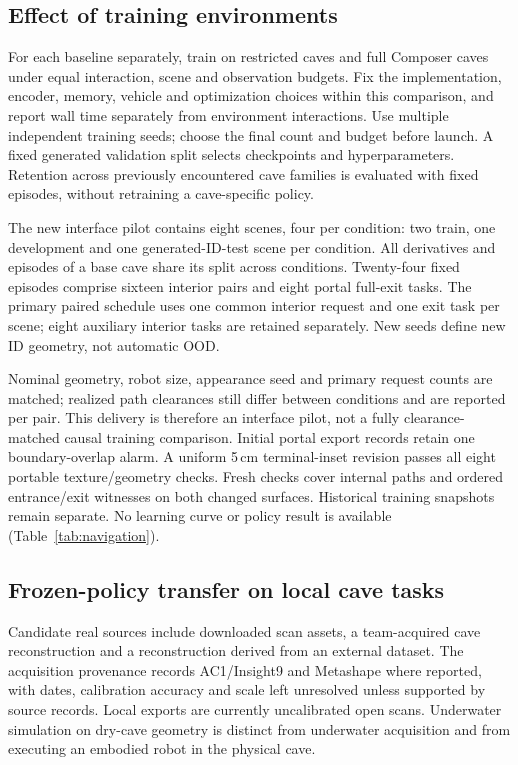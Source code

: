 \subsection{Effect of training environments}
For each baseline separately, train on restricted caves and full Composer
caves under equal interaction, scene and observation budgets. Fix the
implementation, encoder, memory, vehicle and optimization choices within this
comparison, and report wall time separately from environment interactions.
Use multiple independent training seeds; choose the final count and budget
before launch. A fixed generated validation split selects checkpoints and
hyperparameters. Retention across previously encountered cave families is
evaluated with fixed episodes, without retraining a cave-specific policy.

The new interface pilot contains eight scenes, four per condition: two train,
one development and one generated-ID-test scene per condition. All derivatives
and episodes of a base cave share its split across conditions. Twenty-four
fixed episodes comprise sixteen interior pairs and eight portal full-exit
tasks. The primary paired schedule uses one common interior request and one
exit task per scene; eight auxiliary interior tasks are retained separately.
New seeds define new ID geometry, not automatic OOD.

Nominal geometry, robot size, appearance seed and primary request counts are
matched; realized path clearances still differ between conditions and are
reported per pair. This delivery is therefore an interface pilot, not a fully
clearance-matched causal training comparison. Initial portal export records
retain one boundary-overlap alarm. A uniform 5\,cm terminal-inset revision
passes all eight portable texture/geometry checks. Fresh checks cover internal
paths and ordered entrance/exit witnesses on both changed surfaces. Historical
training snapshots remain separate. No learning curve or policy result is
available (Table~\ref{tab:navigation}).


\subsection{Frozen-policy transfer on local cave tasks}
Candidate real sources include downloaded scan assets, a team-acquired cave
reconstruction and a reconstruction derived from an external dataset.
The acquisition provenance records AC1/Insight9 and Metashape where reported,
with dates, calibration accuracy and scale left unresolved unless supported
by source records. Local exports are currently uncalibrated open scans.
Underwater simulation on dry-cave geometry is distinct from underwater
acquisition and from executing an embodied robot in the physical cave.

